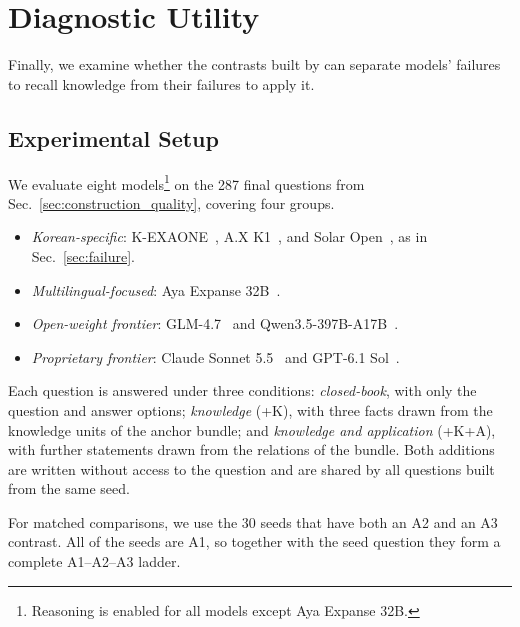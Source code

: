 \section{Diagnostic Utility}
\label{sec:diagnostic}



Finally, we examine whether the contrasts built by \name{} can separate models' failures to recall knowledge from their failures to apply it.


\subsection{Experimental Setup}
\label{sec:diagnostic_setup}

We evaluate eight models\footnote{Reasoning is enabled for all models except Aya Expanse 32B.} on the 287 final questions from Sec.~\ref{sec:construction_quality}, covering four groups.
\begin{itemize}[leftmargin=3.5mm, topsep=2pt, itemsep=2pt, parsep=0pt]
    \item[$\circ$] \textit{Korean-specific}: K-EXAONE~\citep{choi2026k}, A.X K1~\citep{cheon2026ax}, and Solar Open~\citep{park2026solar}, as in Sec.~\ref{sec:failure}.
    \item[$\circ$] \textit{Multilingual-focused}: Aya Expanse 32B~\citep{dang2024aya}.
    \item[$\circ$] \textit{Open-weight frontier}: GLM-4.7~\citep{zai2025glm47} and Qwen3.5-397B-A17B~\citep{qwen2026qwen35}.
    \item[$\circ$] \textit{Proprietary frontier}: Claude Sonnet 5.5~\citep{anthropic2026sonnet55} and GPT-6.1 Sol~\citep{openai2026gpt61sol}.
\end{itemize}

Each question is answered under three conditions: \textit{closed-book}, with only the question and answer options; \textit{knowledge} (+K), with three facts drawn from the knowledge units of the anchor bundle; and \textit{knowledge and application} (+K+A), with further statements drawn from the relations of the bundle.
Both additions are written without access to the question and are shared by all questions built from the same seed.

For matched comparisons, we use the 30 seeds that have both an A2 and an A3 contrast.
All of the seeds are A1, so together with the seed question they form a complete A1--A2--A3 ladder.


